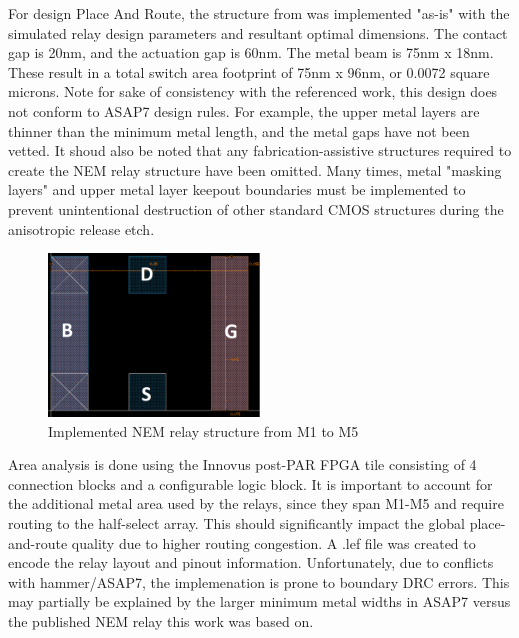 \documentclass[twoside,twocolumn]{article}
\begin{document}

For design Place And Route, the structure from \cite{OLDSIKDER} was implemented "as-is" with the simulated relay design parameters and resultant optimal dimensions. The contact gap is 20nm, and the actuation gap is 60nm. The metal beam is 75nm x 18nm. These result in a total switch area footprint of 75nm x 96nm, or 0.0072 square microns.
Note for sake of consistency with the referenced work, this design does not conform to ASAP7 design rules. For example, the upper metal layers are thinner than the minimum metal length, and the metal gaps have not been vetted.
It shoud also be noted that any fabrication-assistive structures required to create the NEM relay structure have been omitted. Many times, metal "masking layers" and upper metal layer keepout boundaries must be implemented to prevent unintentional destruction of other standard CMOS structures during the anisotropic release etch.

\begin{figure}[!hbt]
    \centering
    \includegraphics[width=0.5\textwidth]{figs/NEMlayout.png}
    \caption{Implemented NEM relay structure from M1 to M5}
    \label{fig:methods}
\end{figure}

Area analysis is done using the Innovus post-PAR FPGA tile consisting of 4 connection blocks and a configurable logic block.
It is important to account for the additional metal area used by the relays, since they span M1-M5 and require routing to the half-select array. This should significantly impact the global place-and-route quality due to higher routing congestion. A .lef file was created to encode the relay layout and pinout information. Unfortunately, due to conflicts with hammer/ASAP7, the implemenation is prone to boundary DRC errors. This may partially be explained by the larger minimum metal widths in ASAP7 versus the published NEM relay this work was based on.
\end{document}
